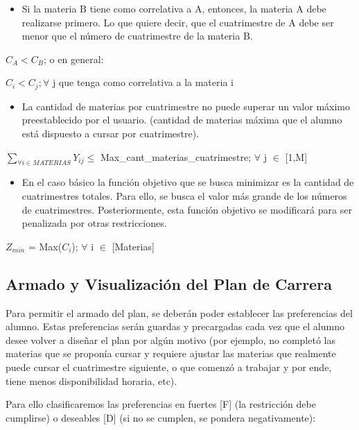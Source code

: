 \documentclass[a4paper]{article}
\begin{document}
\begin{itemize}
	\item Si la materia B tiene como correlativa a A, entonces, la materia A debe realizarse primero. Lo que quiere decir, que el cuatrimestre de A debe ser menor que el número de cuatrimestre de la materia B. 
\end{itemize}

$C_{A} < C_{B}$; o en general:

$C_{i} < C_{j};  \forall$ j que tenga como correlativa a la materia i

\begin{itemize}
	\item La cantidad de materias por cuatrimestre no puede superar un valor máximo preestablecido por el usuario. (cantidad de materias máxima que el alumno está dispuesto a cursar por cuatrimestre).
\end{itemize}

$\sum_{\forall i \in MATERIAS} Y_{ij} \leq$ Max\_cant\_materias\_cuatrimestre;  $\forall$ j $\in$ [1,M]

\begin{itemize}
	\item En el caso básico la función objetivo que se busca minimizar es la cantidad de cuatrimestres totales. Para ello, se busca el valor más grande de los números de cuatrimestres. Posteriormente, esta función objetivo se modificará para ser penalizada por otras restricciones.
\end{itemize}

$Z_{min}$ = Max($C_{i}$);  $\forall$ i $\in$ [Materias]

\subsection{Armado y Visualización del Plan de Carrera}

Para permitir el armado del plan, se deberán poder establecer las preferencias del alumno. Estas preferencias serán guardas y precargadas cada vez que el alumno desee volver a diseñar el plan por algún motivo (por ejemplo, no completó las materias que se proponía cursar y requiere ajustar las materias que realmente puede cursar el cuatrimestre siguiente, o que comenzó a trabajar y por ende, tiene menos disponibilidad horaria, etc).

Para ello clasificaremos las preferencias en fuertes [F] (la restricción debe cumplirse) o deseables [D] (si no se cumplen, se pondera negativamente):
\end{document}
